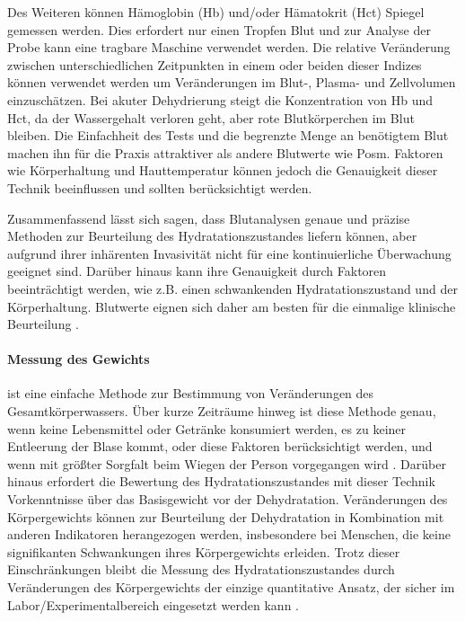 \documentclass[10pt,a4paper,headinclude,twoside, plainheadsepline, open=right, numbers=noenddot, twocolumn]{article}
\begin{document}
Des Weiteren können Hämoglobin (Hb) und/oder Hämatokrit (Hct) Spiegel gemessen werden.
Dies erfordert nur einen Tropfen Blut und zur Analyse der Probe kann eine tragbare Maschine verwendet werden. 
Die relative Veränderung zwischen unterschiedlichen Zeitpunkten in einem oder beiden dieser Indizes können verwendet werden um Veränderungen im Blut-, Plasma- und Zellvolumen einzuschätzen.
Bei akuter Dehydrierung steigt die Konzentration von Hb und Hct, da der Wassergehalt verloren geht, aber rote Blutkörperchen im Blut bleiben.
Die Einfachheit des Tests und die begrenzte Menge an benötigtem Blut machen ihn für die Praxis attraktiver als andere Blutwerte wie Posm.
Faktoren wie Körperhaltung und Hauttemperatur können jedoch die Genauigkeit dieser Technik beeinflussen und sollten berücksichtigt werden.

Zusammenfassend lässt sich sagen, dass Blutanalysen genaue und präzise Methoden zur Beurteilung des Hydratationszustandes liefern können, aber aufgrund ihrer inhärenten Invasivität nicht für eine kontinuierliche Überwachung geeignet sind.
Darüber hinaus kann ihre Genauigkeit durch Faktoren beeinträchtigt werden, wie z.B. einen schwankenden Hydratationszustand und der Körperhaltung. 
Blutwerte eignen sich daher am besten für die einmalige klinische Beurteilung \cite{garret2018engineering}.

\paragraph{Messung des Gewichts} ist eine einfache Methode zur Bestimmung von Veränderungen des Gesamtkörperwassers.
Über kurze Zeiträume hinweg ist diese Methode genau, wenn keine Lebensmittel oder Getränke konsumiert werden, es zu keiner Entleerung der Blase kommt, oder diese Faktoren berücksichtigt werden, und wenn mit größter Sorgfalt beim Wiegen der Person vorgegangen wird \cite{garret2018engineering}.
Darüber hinaus erfordert die Bewertung des Hydratationszustandes mit dieser Technik Vorkenntnisse über das Basisgewicht vor der Dehydratation.
Veränderungen des Körpergewichts können zur Beurteilung der Dehydratation in Kombination mit anderen Indikatoren herangezogen werden, insbesondere bei Menschen, die keine signifikanten Schwankungen ihres Körpergewichts erleiden. 
Trotz dieser Einschränkungen bleibt die Messung des Hydratationszustandes durch Veränderungen des Körpergewichts der einzige quantitative Ansatz, der sicher im Labor/Experimentalbereich eingesetzt werden kann \cite{kavouras2002assessing}.
\end{document}
